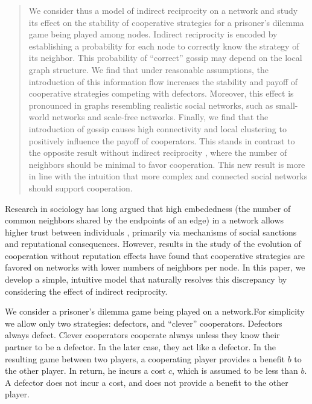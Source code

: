 \documentclass{article}
\renewcommand{\=}[1]{\stackrel{#1}{=}} %
\begin{document}
\begin{abstract}
We consider thus a model of indirect reciprocity on a network and study its effect on the stability of cooperative strategies for a prisoner's dilemma game being played among nodes. Indirect reciprocity is encoded by establishing a probability for each node to correctly know the strategy of its neighbor. This probability of ``correct'' gossip may depend on the local graph structure. We find that under reasonable assumptions, the introduction of this information flow increases the stability and payoff of cooperative strategies competing with defectors. Moreover, this effect is pronounced in graphs resembling realistic social networks, such as small-world networks and scale-free networks. Finally, we find
that the introduction of gossip causes high connectivity and local clustering to positively influence the payoff of cooperators. This stands in contrast to the opposite result without indirect reciprocity \cite{ohtsuki2006simple}, where the number of neighbors should be minimal to favor cooperation. This new result is more in line with the intuition that more complex and connected social networks should support cooperation.

\end{abstract}


Research in sociology has long argued that high embededness (the number of common neighbors shared by the endpoints of an edge) in a network allows higher trust between individuals \cite{easley2010networks}, primarily via mechanisms of social sanctions and reputational consequences. However, results in the study of the evolution of cooperation without reputation effects \cite{ohtsuki2006simple} have found that cooperative strategies are favored on networks with lower numbers of neighbors per node. In this paper, we develop a simple, intuitive model that naturally resolves this discrepancy by considering the effect of indirect reciprocity.

We consider a prisoner's dilemma game being played on a network.For simplicity we allow only two strategies: defectors, and ``clever'' cooperators. Defectors always defect. Clever cooperators cooperate always unless they know their partner to be a defector. In the later case, they act like a defector. In the resulting game between two players, a cooperating player provides a benefit $b$ to the other player. In return, he incurs a cost $c$, which is assumed to be less than $b$. A defector does not incur a cost, and does not provide a benefit to the other player.
\end{document}
